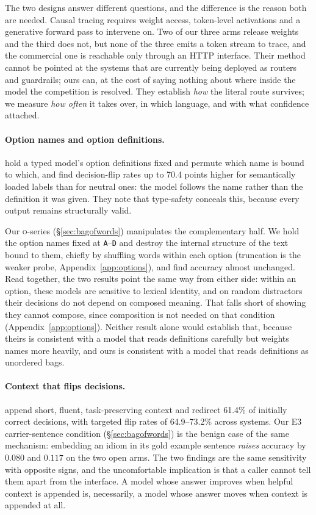 \documentclass[11pt]{article}
\begin{document}
The two designs answer different questions, and the difference is the reason
both are needed. Causal tracing requires weight access, token-level activations
and a generative forward pass to intervene on. Two of our three arms release
weights and the third does not, but none of the three emits a token stream to
trace, and the commercial one is reachable only through an HTTP interface. Their method cannot be pointed at
the systems that are currently being deployed as routers and guardrails; ours
can, at the cost of saying nothing about where inside the model the competition
is resolved. They establish \emph{how} the literal route survives; we measure
\emph{how often} it takes over, in which language, and with what confidence
attached.

\paragraph{Option names and option definitions.} \citet{sun2026typesafe} hold a
typed model's option definitions fixed and permute which name is bound to which,
and find decision-flip rates up to 70.4 points higher for semantically loaded
labels than for neutral ones: the model follows the name rather than the
definition it was given. They note that type-safety conceals this, because every
output remains structurally valid.

Our \textsc{o}-series (\S\ref{sec:bagofwords}) manipulates the complementary
half. We hold the option names fixed at \texttt{A}--\texttt{D} and destroy the
internal structure of the text bound to them, chiefly by shuffling words within
each option (truncation is the weaker probe, Appendix~\ref{app:options}), and find
accuracy almost unchanged. Read together, the two results point the same way from
either side: within an option, these models are sensitive to lexical identity, and
on random distractors their decisions do not depend on composed meaning. That falls
short of showing they cannot compose, since composition is not needed on that
condition (Appendix~\ref{app:options}). Neither result alone would establish that, because theirs is consistent
with a model that reads definitions carefully but weights names more heavily,
and ours is consistent with a model that reads definitions as unordered bags.

\paragraph{Context that flips decisions.} \citet{xu2026jevout} append short,
fluent, task-preserving context and redirect 61.4\% of initially correct
decisions, with targeted flip rates of 64.9--73.2\% across systems. Our E3
carrier-sentence condition (\S\ref{sec:bagofwords}) is the benign case of the same
mechanism: embedding an idiom in its gold example sentence \emph{raises}
accuracy by $0.080$ and $0.117$ on the two open arms. The two findings are the
same sensitivity with opposite signs, and the uncomfortable implication is that
a caller cannot tell them apart from the interface. A model whose answer
improves when helpful context is appended is, necessarily, a model whose answer
moves when context is appended at all.
\end{document}
